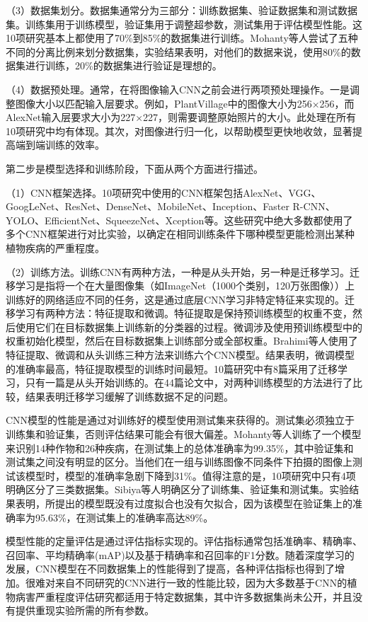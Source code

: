 （3）数据集划分。数据集通常分为三部分：训练数据集、验证数据集和测试数据集。训练集用于训练模型，验证集用于调整超参数，测试集用于评估模型性能。这10项研究基本上都使用了70\%到85\%的数据集进行训练。Mohanty等人尝试了五种不同的分离比例来划分数据集，实验结果表明，对他们的数据来说，使用80\%的数据集进行训练，20\%的数据集进行验证是理想的。

（4）数据预处理。通常，在将图像输入CNN之前会进行两项预处理操作。一是调整图像大小以匹配输入层要求。例如，PlantVillage中的图像大小为256×256，而AlexNet输入层要求大小为227×227，则需要调整原始照片的大小。此处理在所有10项研究中均有体现。其次，对图像进行归一化，以帮助模型更快地收敛，显著提高端到端训练的效率。

第二步是模型选择和训练阶段，下面从两个方面进行描述。

（1）CNN框架选择。10项研究中使用的CNN框架包括AlexNet、VGG、GoogLeNet、ResNet、DenseNet、MobileNet、Inception、Faster R-CNN、YOLO、EfficientNet、SqueezeNet、Xception等。这些研究中绝大多数都使用了多个CNN框架进行对比实验，以确定在相同训练条件下哪种模型更能检测出某种植物疾病的严重程度。

（2）训练方法。训练CNN有两种方法，一种是从头开始，另一种是迁移学习。迁移学习是指将一个在大量图像集（如ImageNet（1000个类别，120万张图像））上训练好的网络适应不同的任务，这是通过底层CNN学习非特定特征来实现的。迁移学习有两种方法：特征提取和微调。特征提取是保持预训练模型的权重不变，然后使用它们在目标数据集上训练新的分类器的过程。微调涉及使用预训练模型中的权重初始化模型，然后在目标数据集上训练部分或全部权重。Brahimi等人使用了特征提取、微调和从头训练三种方法来训练六个CNN模型。结果表明，微调模型的准确率最高，特征提取模型的训练时间最短。10篇研究中有8篇采用了迁移学习，只有一篇是从头开始训练的。在44篇论文中，对两种训练模型的方法进行了比较，结果表明迁移学习缓解了训练数据不足的问题。


CNN模型的性能是通过对训练好的模型使用测试集来获得的。测试集必须独立于训练集和验证集，否则评估结果可能会有很大偏差。Mohanty等人训练了一个模型来识别14种作物和26种疾病，在测试集上的总体准确率为99.35\%，其中验证集和测试集之间没有明显的区分。当他们在一组与训练图像不同条件下拍摄的图像上测试该模型时，模型的准确率急剧下降到31\%。值得注意的是，10项研究中只有4项明确区分了三类数据集。Sibiya等人明确区分了训练集、验证集和测试集。实验结果表明，所提出的模型既没有过度拟合也没有欠拟合，因为该模型在验证集上的准确率为95.63\%，在测试集上的准确率高达89\%。

模型性能的定量评估是通过评估指标实现的。评估指标通常包括准确率、精确率、召回率、平均精确率(mAP)以及基于精确率和召回率的F1分数。随着深度学习的发展，CNN模型在不同数据集上的性能得到了提高，各种评估指标也得到了增加。很难对来自不同研究的CNN进行一致的性能比较，因为大多数基于CNN的植物病害严重程度评估研究都适用于特定数据集，其中许多数据集尚未公开，并且没有提供重现实验所需的所有参数。

